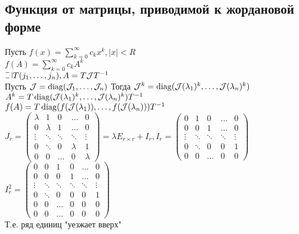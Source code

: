 \documentclass[12pt]{article}
\begin{document}
\subsection{Функция от матрицы, приводимой к жордановой форме}
Пусть $f(x) = \sum_{k=0}^\infty c_k x^k, |x| < R$\\
$f(A) = \sum_{k=0}^\infty c_k A^k$\\
$\letus T(j_1, \ldots, j_n), A=T\mcJ T^{-1}$\\
Пусть $\mathcal{J} = \operatorname{diag}(\mathcal{J}_1, \ldots, \mathcal{J}_n)$
Тогда $\mathcal{J}^k = \operatorname{diag}(\mathcal{J}(\lambda_1)^k, \ldots, \mathcal{J}(\lambda_n)^k)$\\
$A^k = T\operatorname{diag}(\mathcal{J}(\lambda_1)^k, \ldots, \mathcal{J}(\lambda_n)^k)T^{-1}$\\
$f(A) = T\operatorname{diag}(f(\mathcal{J}(\lambda_1)), \ldots, f(\mathcal{J}(\lambda_n)))T^{-1}$\\
$J_r = \begin{pmatrix}
    \lambda & 1 & 0 & \ldots & 0\\
    0 & \lambda & 1 & \ldots & 0\\
    \vdots & \ddots & \ddots & \ddots & \vdots\\
    0 & \ddots & 0 & \lambda & 1\\
    0 & 0 & \ldots & 0 & \lambda
\end{pmatrix} = \lambda E_{r\times r} + I_r, I_r = \begin{pmatrix}
    0 & 1 & 0 & \ldots & 0\\
    0 & 0 & 1 & \ldots & 0\\
    \vdots & \ddots & \ddots & \ddots & \vdots\\
    0 & \ddots & 0 & 0 & 1\\
    0 & 0 & \ldots & 0 & 0
\end{pmatrix}$\\
$I_r^2 = \begin{pmatrix}
    0 & 0 & 1 & 0 & \ldots & 0\\
    0 & 0 & 0 & 1 & \ldots & 0\\
    \vdots & \ddots & \ddots & \ddots & \ddots & \vdots\\
    0 & \ddots & 0 & 0 & 0 & 1\\
    0 & 0 & \ldots & 0 & 0 & 0\\
    0 & 0 & \ldots & 0 & 0 & 0
\end{pmatrix}$\\
Т.е. ряд единиц "уезжает вверх"\\
\end{document}
